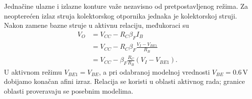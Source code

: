 Jednačine ulazne i izlazne konture važe nezavisno od pretpostavljenog režima. Za neopterećen izlaz struja kolektorskog otpornika jednaka je kolektorskoj struji. Nakon zamene bazne struje u aktivnu relaciju, međukoraci su
\[\begin{aligned}
V_O&=V_{CC}-R_C\beta_FI_B\\
&=V_{CC}-R_C\beta_F\frac{V_I-V_{BE1}}{R_B}\\
&=V_{CC}-\beta_F\frac{R_C}{R_B}(V_I-V_{BE1}).
\end{aligned}\]
U aktivnom režimu $V_{BE1}=V_{BE}$, a pri odabranoj modelnoj vrednosti $V_{BE}=0.6\,\mathrm{V}$ dobijamo konačan afini izraz. Relacija se koristi u oblasti aktivnog rada; granice oblasti proveravaju se posebnim modelima.
